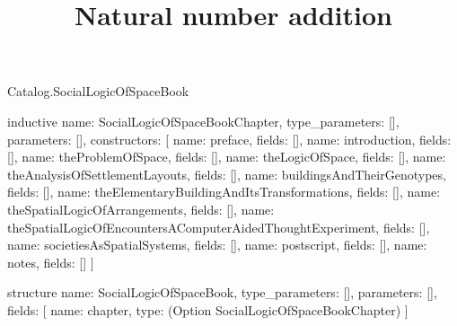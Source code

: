 \begin{lexlean}{Catalog.SocialLogicOfSpaceBook}
\title{Natural number addition}
\begin{semanticmodule}
inductive{
  name: SocialLogicOfSpaceBookChapter,
  type_parameters: [],
  parameters: [],
  constructors: [
    {name: preface, fields: []},
    {name: introduction, fields: []},
    {name: theProblemOfSpace, fields: []},
    {name: theLogicOfSpace, fields: []},
    {name: theAnalysisOfSettlementLayouts, fields: []},
    {name: buildingsAndTheirGenotypes, fields: []},
    {name: theElementaryBuildingAndItsTransformations, fields: []},
    {name: theSpatialLogicOfArrangements, fields: []},
    {name: theSpatialLogicOfEncountersAComputerAidedThoughtExperiment, fields: []},
    {name: societiesAsSpatialSystems, fields: []},
    {name: postscript, fields: []},
    {name: notes, fields: []}
  ]
}

structure{
  name: SocialLogicOfSpaceBook,
  type_parameters: [],
  parameters: [],
  fields: [
    {name: chapter, type: (Option SocialLogicOfSpaceBookChapter)}
  ]
}
\end{semanticmodule}
\end{lexlean}
